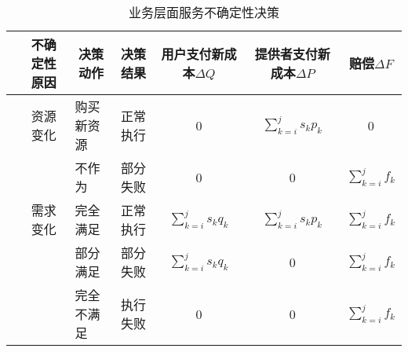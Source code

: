 \begin{table}[htbp]
    \caption{业务层面服务不确定性决策}
    \vspace{-0.5em}\label{table:state_action_business}\centering{}
    \begin{threeparttable}
        \begin{tabular}{lllllll}
            \toprule
            & \multicolumn{1}{c}{不确定性原因} 
            & \multicolumn{1}{c}{{决策动作}} 
            & \multicolumn{1}{c}{决策结果} 
            & \multicolumn{1}{c}{用户支付新成本$\Delta Q$} 
            & \multicolumn{1}{c}{提供者支付新成本$\Delta P$} 
            & \multicolumn{1}{c}{赔偿$\Delta F$} \\
            \hline

            & \multicolumn{1}{c}{资源变化} 
            & \multicolumn{1}{l}{购买新资源} 
            & \multicolumn{1}{c}{正常执行} 
            & \multicolumn{1}{c}{0} 
            & \multicolumn{1}{c}{$\sum\limits_{k = i}^j {{s_k}{p_k}}$\tnote{1}} 
            & \multicolumn{1}{c}{0} \\
            
            & \multicolumn{1}{c}{} 
            & \multicolumn{1}{l}{不作为} 
            & \multicolumn{1}{c}{部分失败\tnote{2}} 
            & \multicolumn{1}{c}{0} 
            & \multicolumn{1}{c}{0} 
            & \multicolumn{1}{c}{$\sum\limits_{k = i}^j {{f_k}}$\tnote{3}} \\
            
            & \multicolumn{1}{c}{需求变化} 
            & \multicolumn{1}{l}{完全满足} 
            & \multicolumn{1}{c}{正常执行\tnote{2}} 
            & \multicolumn{1}{c}{$\sum\limits_{k = i}^j {{s_k}{q_k}}$\tnote{4}} 
            & \multicolumn{1}{c}{$\sum\limits_{k = i}^j {{s_k}{p_k}}$} 
            & \multicolumn{1}{c}{$\sum\limits_{k = i}^j {{f_k}}$} \\
            
            & \multicolumn{1}{c}{} 
            & \multicolumn{1}{l}{部分满足} 
            & \multicolumn{1}{c}{部分失败\tnote{2}} 
            & \multicolumn{1}{c}{$\sum\limits_{k = i}^j {{s_k}{q_k}}$\tnote{4}} 
            & \multicolumn{1}{c}{0} 
            & \multicolumn{1}{c}{$\sum\limits_{k = i}^j {{f_k}}$} \\
            
            & \multicolumn{1}{c}{} 
            & \multicolumn{1}{l}{完全不满足} 
            & \multicolumn{1}{c}{执行失败\tnote{2}} 
            & \multicolumn{1}{c}{0} 
            & \multicolumn{1}{c}{0} 
            & \multicolumn{1}{c}{$\sum\limits_{k = i}^j {{f_k}}$} \\
            \bottomrule
            

\end{tabular}
\end{threeparttable}
\end{table}
